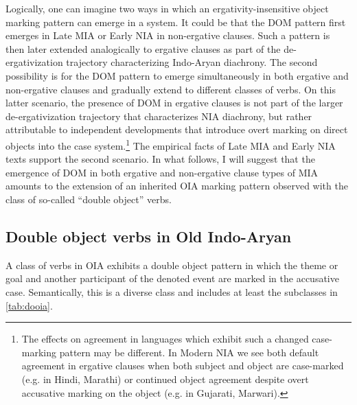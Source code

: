 \documentclass[output=paper,
modfonts
]{LSP/langsci}
\begin{document}
Logically, one can imagine two ways in which an ergativity-insensitive object marking pattern can emerge in a system. It could be that the DOM pattern first emerges in 
 Late MIA or Early NIA in non-ergative clauses. Such a pattern   is then later extended analogically to ergative clauses as part of the de-ergativization trajectory characterizing Indo-Aryan diachrony. The second possibility is for the DOM pattern to emerge simultaneously in both ergative and non-ergative clauses and gradually extend to different classes of verbs. On this latter scenario, the presence of DOM in ergative clauses is not part of the larger de-ergativization trajectory that characterizes NIA diachrony, but rather attributable to independent developments  that introduce overt marking on direct objects into the case system.\footnote{The effects on agreement in languages which exhibit such  a changed case-marking pattern may be different. In Modern NIA we see both default agreement in ergative clauses  when both subject and object are case-marked (e.g. in Hindi, Marathi) or   continued object agreement despite overt accusative marking on the object (e.g. in Gujarati, Marwari).} The empirical facts of Late MIA and Early NIA texts support the second scenario.  In what follows, I will suggest that the  emergence of  DOM in both ergative and non-ergative clause types of MIA  amounts to  the extension of an inherited OIA  marking pattern observed with the class of so-called ``double object'' verbs.


 
\subsection{Double object verbs in Old Indo-Aryan}
A class of verbs in OIA exhibits a double object pattern in  which the theme or goal and another participant of the denoted event are marked in the accusative case. Semantically, this is a diverse class and includes at least the subclasses in \cref{tab:dooia}. 
\end{document}
